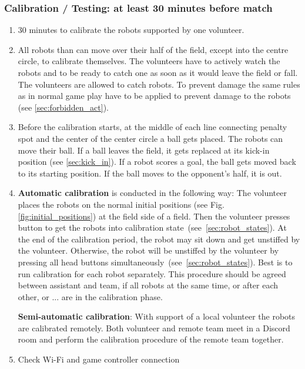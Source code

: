 \subsubsection{Calibration / Testing: at least 30 minutes before match}
    \begin{enumerate}
        \item 30 minutes to calibrate the robots supported by one volunteer.
        \item All robots than can move over their half of the field, except into the centre circle, to calibrate themselves. The volunteers have to actively watch the robots and to be ready to catch one as soon as it would leave the field or fall. The volunteers are allowed to catch robots. To prevent damage the same rules as in normal game play have to be applied to prevent damage to the robots (see \ref{sec:forbidden_act}).
        \item Before the calibration starts, at the middle of each line connecting penalty spot and the center of the center circle a ball gets placed. The robots can move their ball. If a ball leaves the field, it gets replaced at its kick-in position (see \ref{sec:kick_in}). If a robot scores a goal, the ball gets moved back to its starting position. If the ball moves to the opponent's half, it is out.
        \item \textbf{Automatic calibration} is conducted in the following way: The volunteer places the robots on the normal initial positions (see Fig.\,\ref{fig:initial_positions}) at the field side of a field. Then the volunteer presses button to get the robots into calibration state~(see~\ref{sec:robot_states}). At the end of the calibration period, the robot may sit down and get unstiffed by the volunteer. Otherwise, the robot will be unstiffed by the volunteer by pressing all head buttons simultaneously~(see~\ref{sec:robot_states}). Best is to run calibration for each robot separately. This procedure should be agreed between assistant and team, if all robots at the same time, or after each other, or ... are in the calibration phase.
     
        \textbf{Semi-automatic calibration}: With support of a local volunteer the robots are calibrated remotely. Both volunteer and remote team meet in a Discord room and perform the calibration procedure of the remote team together.

        \item  Check Wi-Fi and game controller connection
    \end{enumerate}

